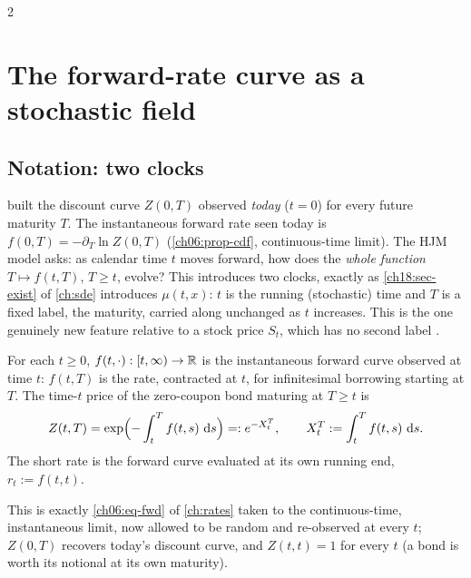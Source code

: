 \begin{paracol}{2}
\section{The forward-rate curve as a stochastic field}\label{ch24:sec-setup}

\subsection{Notation: two clocks}
 built the discount curve $Z(0,T)$ observed \emph{today} ($t=0$) for every future maturity $T$. The instantaneous forward rate seen today is $f(0,T)=-\partial_T\ln Z(0,T)$ (\cref{ch06:prop-cdf}, continuous-time limit). The HJM model asks: as calendar time $t$ moves forward, how does the \emph{whole function} $T\mapsto f(t,T)$, $T\ge t$, evolve? This introduces two clocks, exactly as \cref{ch18:sec-exist} of \cref{ch:sde} introduces $\mu(t,x)$: $t$ is the running (stochastic) time and $T$ is a fixed label, the maturity, carried along unchanged as $t$ increases. This is the one genuinely new feature relative to a stock price $S_t$, which has no second label .

\begin{definition}\label{ch24:def-fwd}
For each $t\ge0$, $f(t,\cdot):[t,\infty)\to\mathbb{R}$ is the instantaneous forward curve observed at time $t$: $f(t,T)$ is the rate, contracted at $t$, for infinitesimal borrowing starting at $T$. The time-$t$ price of the zero-coupon bond maturing at $T\ge t$ is
\begin{equation}\label{ch24:eq-bond}
  Z(t,T)=\exp\Bigl(-\int_t^Tf(t,s)\,\,\mathrm{d} s\Bigr)=:e^{-X_t^T},\qquad X_t^T:=\int_t^Tf(t,s)\,\,\mathrm{d} s .
\end{equation}
The short rate is the forward curve evaluated at its own running end, $r_t:=f(t,t)$.
\end{definition}
 This is exactly \eqref{ch06:eq-fwd} of \cref{ch:rates} taken to the continuous-time, instantaneous limit, now allowed to be random and re-observed at every $t$; $Z(0,T)$ recovers today's discount curve, and $Z(t,t)=1$ for every $t$ (a bond is worth its notional at its own maturity).


\end{paracol}
